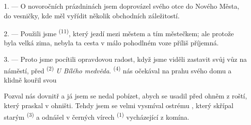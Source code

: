 %
%
%


\VUsaut{4.0mm}
\VUsaut{3.0mm}
\VUfilet{16mm}
\VUsaut{5.6mm}
\VUsaut{3.0mm}

\VUsaut{3.0mm}

\VUsaut{4.0mm}

1. --- O novoročních prázdninách jsem doprovázel svého otce do Nového Města, do vesničky, kde
měl vyřídit několik obchodních záležitostí.

2. --- Použili jsme  \textsuperscript{(11)}, který jezdí mezi městem a tím
městečkem; ale protože byla velká zima, nebyla ta cesta v málo pohodlném voze příliš příjemná.

3. --- Proto jsme pocítili opravdovou radost, když jsme viděli  zastavit svůj
vůz na náměstí, před  \textsuperscript{(2)} \textit{U Bílého medvěda}.
 \textsuperscript{(4)} nás očekával na prahu svého domu a klidně kouřil svou

Pozval nás dovnitř a já jsem se nedal pobízet, abych se usadil před ohněm z roští, který
praskal v ohništi. Tehdy jsem se velmi vysmíval ostrému , který
skřípal starým  \textsuperscript{(3)} a odnášel v černých vírech
 \textsuperscript{(1)} vycházející z komína.

